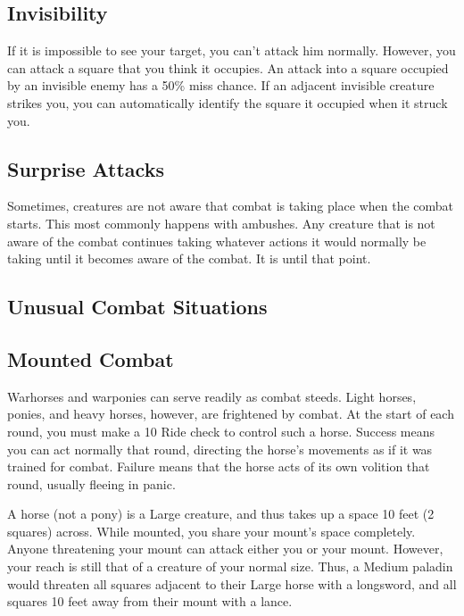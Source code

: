     \subsection{Invisibility}\label{Invisibility}
        If it is impossible to see your target, you can't attack him normally. However, you can attack a square that you think it occupies. An attack into a square occupied by an invisible enemy has a 50\% miss chance. If an adjacent invisible creature strikes you, you can automatically identify the square it occupied when it struck you.

    \subsection{Surprise Attacks}\label{Surprise Attacks}
        Sometimes, creatures are not aware that combat is taking place when the combat starts. This most commonly happens with ambushes. Any creature that is not aware of the combat continues taking whatever actions it would normally be taking until it becomes aware of the combat. It is \unaware until that point.

    \subsection{Unusual Combat Situations}

        \subsection{Mounted Combat}\label{Mounted Combat}
             Warhorses and warponies can serve readily as combat steeds. Light horses, ponies, and heavy horses, however, are frightened by combat.
            At the start of each round, you must make a  10 Ride check to control such a horse.
            Success means you can act normally that round, directing the horse's movements as if it was trained for combat.
            Failure means that the horse acts of its own volition that round, usually fleeing in panic.

             A horse (not a pony) is a Large creature, and thus takes up a space 10 feet (2 squares) across. While mounted, you share your mount's space completely. Anyone threatening your mount can attack either you or your mount. However, your reach is still that of a creature of your normal size. Thus, a Medium paladin would threaten all squares adjacent to their Large horse with a longsword, and all squares 10 feet away from their mount with a lance.


